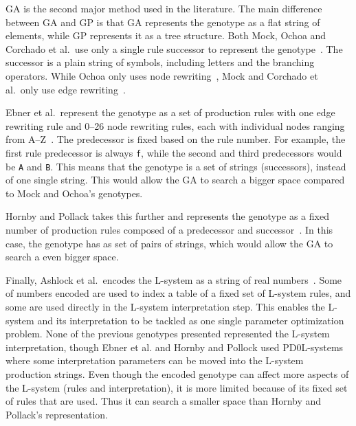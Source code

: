 GA is the second major method used in the literature.
The main difference between GA and GP is that GA represents the genotype as a flat string of elements, while GP represents it as a tree structure.
Both Mock, Ochoa and Corchado et al.\ use only a single rule successor to represent the genotype~\cite{1998Mock,1998Ochoa,2009Corchado}.
The successor is a plain string of symbols, including letters and the branching operators.
While Ochoa only uses node rewriting~\cite{1998Ochoa}, Mock and Corchado et al.\ only use edge rewriting~\cite{1998Mock, 2009Corchado}.

Ebner et al.\ represent the genotype as a set of production rules with one edge rewriting rule and 0--26 node rewriting rules, each with individual nodes ranging from A--Z~\cite{2002Ebner,2003Ebner}.
The predecessor is fixed based on the rule number.
For example, the first rule predecessor is always \texttt{f}, while the second and third predecessors would be \texttt{A} and \texttt{B}.
This means that the genotype is a set of strings (successors), instead of one single string.
This would allow the GA to search a bigger space compared to Mock and Ochoa's genotypes.

Hornby and Pollack takes this further and represents the genotype as a fixed number of production rules composed of a predecessor and successor~\cite{2001Hornby}.
In this case, the genotype has as set of pairs of strings, which would allow the GA to search a even bigger space.

Finally, Ashlock et al.\ encodes the L-system as a string of real numbers~\cite{2006Ashlock}.
Some of numbers encoded are used to index a table of a fixed set of L-system rules, and some are used directly in the L-system interpretation step.
This enables the L-system and its interpretation to be tackled as one single parameter optimization problem.
None of the previous genotypes presented represented the L-system interpretation, though Ebner et al. and Hornby and Pollock used PD0L-systems where some interpretation parameters can be moved into the L-system production strings.
Even though the encoded genotype can affect more aspects of the L-system (rules and interpretation), it is more limited because of its fixed set of rules that are used.
Thus it can search a smaller space than Hornby and Pollack's representation.

